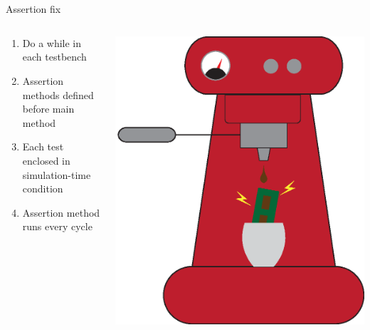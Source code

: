 \documentclass[aspectratio=169, handout]{beamer}
\begin{document}
\section*{}
\begin{frame}{Assertion fix}
    \begin{columns}[c]
        \begin{column}{.3\textwidth}
            \begin{enumerate}
                \item Do a while in each testbench
                \item Assertion methods defined before main method
                \item Each test enclosed in simulation-time condition
                \item Assertion method runs every cycle
            \end{enumerate}
        \end{column}
        \begin{column}{.5\textwidth}
            \includegraphics[width=.8\columnwidth]{graphics/steelbrew.eps}
        \end{column}
    \end{columns}
\end{frame}
\end{document}
